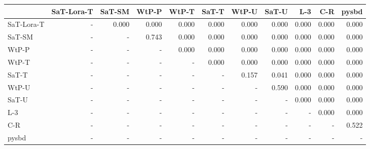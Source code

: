 \begin{tabular}{lrrrrrrrrrr}
\toprule
 & SaT-Lora-T & SaT-SM & WtP-P & WtP-T & SaT-T & WtP-U & SaT-U & L-3 & C-R & pysbd \\
\midrule
SaT-Lora-T & - & 0.000 & 0.000 & 0.000 & 0.000 & 0.000 & 0.000 & 0.000 & 0.000 & 0.000 \\
SaT-SM & - & - & 0.743 & 0.000 & 0.000 & 0.000 & 0.000 & 0.000 & 0.000 & 0.000 \\
WtP-P & - & - & - & 0.000 & 0.000 & 0.000 & 0.000 & 0.000 & 0.000 & 0.000 \\
WtP-T & - & - & - & - & 0.000 & 0.000 & 0.000 & 0.000 & 0.000 & 0.000 \\
SaT-T & - & - & - & - & - & 0.157 & 0.041 & 0.000 & 0.000 & 0.000 \\
WtP-U & - & - & - & - & - & - & 0.590 & 0.000 & 0.000 & 0.000 \\
SaT-U & - & - & - & - & - & - & - & 0.000 & 0.000 & 0.000 \\
L-3 & - & - & - & - & - & - & - & - & 0.000 & 0.000 \\
C-R & - & - & - & - & - & - & - & - & - & 0.522 \\
pysbd & - & - & - & - & - & - & - & - & - & - \\
\bottomrule
\end{tabular}

